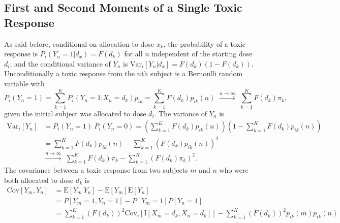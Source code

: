 \subsection{First and Second Moments of a Single Toxic Response}
As said before, conditional on allocation to dose $x_k$, the probability of a toxic response is $P_i(Y_n=1|d_x)=F(d_k)$ for all $n$ independent of the starting dose $d_i$; and the conditional variance of $Y_n$ is
$\textrm{Var}_i\left[Y_n|d_x\right]=F(d_k)\left(1-F(d_k)\right)$.
Unconditionally a toxic response from  the $n$th subject  is a Bernoulli random variable with
$$P_i(Y_n=1)=\sum_{k=1}^K P_i(Y_n=1|X_n=d_k)p_{ik}=\sum_{k=1}^KF(d_k)p_{ik}(n)\,\, \stackrel{n\rightarrow\infty}\longrightarrow \,\,
\sum_{k=1}^KF(d_k)\pi_k,$$
given the initial subject was allocated to dose $d_i$.  The variance of $Y_n$ is
\begin{align*}
\textrm{Var}_i\left[Y_n\right]&=P_i(Y_n=1)\ P_i(Y_n=0)
=\left(\sum_{k=1}^KF(d_k)p_{ik}(n)\right)\left(1-\sum_{k=1}^KF(d_k)p_{ik}(n)\right)\\
&=\sum_{k=1}^KF(d_k)p_{ik}(n)-\sum_{k=1}^K\left(F(d_k)p_{ik}(n)\right)^2\\
&\stackrel{n\rightarrow\infty}\longrightarrow \,\,
\sum_{k=1}^KF(d_k)\pi_k-\sum_{k=1}^K\left(F(d_k)\pi_k\right)^2.
\end{align*}
The covariance between a toxic response from two subjects $m$ and $n$ who were both allocated to dose $d_k$ is
\begin{align*}
\textrm{Cov}\left[Y_m,Y_n\right]
&=\textrm{E}\left[Y_m\ Y_n\right]-\textrm{E}\left[Y_m\right]\textrm{E}\left[ Y_n\right]\\
&=P\left[Y_m=1, Y_n=1\right]-P\left[Y_m=1\right]P\left[Y_n=1\right]\\
&=\sum_{k=1}^K(F(d_k))^2\textrm{Cov}_i\left[\textrm{I}[X_m=d_k,X_n=d_k]\right]-\sum_{k=1}^K(F(d_k))^2p_{ik}(m)p_{ik}(n)
\end{align*}

